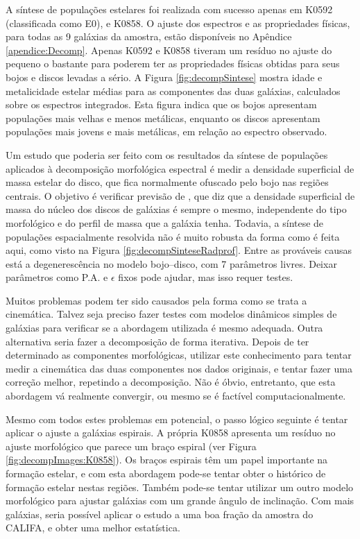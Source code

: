 A síntese de populações estelares foi realizada com sucesso apenas em K0592
(classificada como E0), e K0858. O ajuste dos espectros e as propriedades
físicas, para todas as 9 galáxias da amostra, estão disponíveis no Apêndice
\ref{apendice:Decomp}. Apenas K0592 e K0858 tiveram um resíduo no ajuste do
\starlight pequeno o bastante para poderem ter as propriedades físicas obtidas
para seus bojos e discos levadas a sério. A Figura \ref{fig:decompSintese}
mostra idade e metalicidade estelar médias para as componentes das duas
galáxias, calculados sobre os espectros integrados. Esta figura indica que os
bojos apresentam populações mais velhas e menos metálicas, enquanto os discos
apresentam populações mais jovens e mais metálicas, em relação ao espectro
observado.

Um estudo que poderia ser feito com os resultados da síntese de populações
aplicados à decomposição morfológica espectral é medir a densidade superficial
de massa estelar do disco, que fica normalmente ofuscado pelo bojo nas regiões
centrais. O objetivo é verificar previsão de \citet{Freeman1970}, que diz que a
densidade superficial de massa do núcleo dos discos de galáxias é sempre o
mesmo, independente do tipo morfológico e do perfil de massa que a galáxia
tenha. Todavia, a síntese de populações espacialmente resolvida não é muito
robusta da forma como é feita aqui, como visto na Figura
\ref{fig:decompSinteseRadprof}. Entre as prováveis causas está a degenerescência
no modelo bojo--disco, com 7 parâmetros livres. Deixar parâmetros como P.A. e
$\epsilon$ fixos pode ajudar, mas isso requer testes.

Muitos problemas podem ter sido causados pela forma como se trata a cinemática.
Talvez seja preciso fazer testes com modelos dinâmicos simples de galáxias para
verificar se a abordagem utilizada é mesmo adequada. Outra alternativa seria
fazer a decomposição de forma iterativa. Depois de ter determinado as
componentes morfológicas, utilizar este conhecimento para tentar medir a
cinemática das duas componentes nos dados originais, e tentar fazer uma
correção melhor, repetindo a decomposição. Não é óbvio, entretanto, que esta
abordagem vá realmente convergir, ou mesmo se é factível computacionalmente.

Mesmo com todos estes problemas em potencial, o passo lógico seguinte é tentar
aplicar o ajuste a galáxias espirais. A própria K0858 apresenta um resíduo no
ajuste morfológico que parece um braço espiral (ver Figura
\ref{fig:decompImages:K0858}). Os braços espirais têm um papel importante na
formação estelar, e com esta abordagem pode-se tentar obter o histórico de
formação estelar nestas regiões. Também pode-se tentar utilizar um outro modelo
morfológico para ajustar galáxias com um grande ângulo de inclinação. Com mais
galáxias, seria possível aplicar o estudo a uma boa fração da amostra do CALIFA,
e obter uma melhor estatística.


